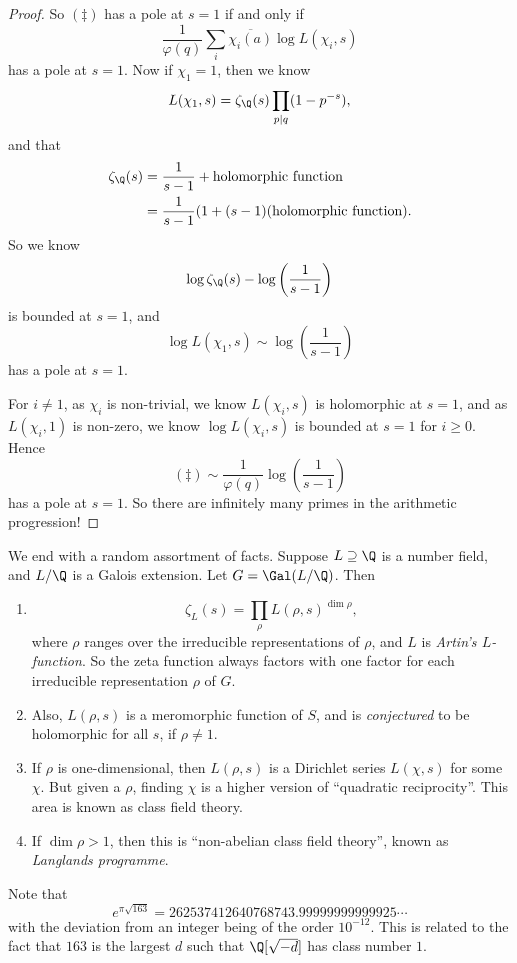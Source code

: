 \documentclass[a4paper]{article}
\begin{document}
\begin{proof}
  So $(\ddagger)$ has a pole at $s = 1$ if and only if
  \[
    \frac{1}{\varphi(q)} \sum_i \overline{\chi_i (a)} \log L(\chi_i, s)
  \]
  has a pole at $s = 1$. Now if $\chi_1 = 1$, then we know
  \[
    L(\chi_1, s) = \zeta_{\Q}(s) \prod_{p \mid q}(1 - p^{-s}),
  \]
  and that
  \begin{align*}
    \zeta_\Q(s) &= \frac{1}{s - 1} + \text{holomorphic function} \\
    &= \frac{1}{s - 1}(1 + (s - 1)(\text{holomorphic function}).
  \end{align*}
  So we know
  \[
    \log \zeta_\Q(s) - \log\left(\frac{1}{s - 1}\right)
  \]
  is bounded at $s = 1$, and
  \[
    \log L(\chi_1, s) \sim \log\left(\frac{1}{s - 1}\right)
  \]
  has a pole at $s = 1$.

  For $i \not= 1$, as $\chi_i$ is non-trivial, we know $L(\chi_i, s)$ is holomorphic at $s = 1$, and as $L(\chi_i, 1)$ is non-zero, we know $\log L(\chi_i, s)$ is bounded at $s = 1$ for $i \geq 0$. Hence
  \[
    (\ddagger) \sim \frac{1}{\varphi(q)} \log\left(\frac{1}{s - 1}\right)
  \]
  has a pole at $s = 1$. So there are infinitely many primes in the arithmetic progression!
\end{proof}

We end with a random assortment of facts. Suppose $L \supseteq \Q$ is a number field, and $L/\Q$ is a Galois extension. Let $G = \Gal(L/\Q)$. Then

\begin{enumerate}
  \item
    \[
      \zeta_L(s) = \prod_{\rho} L(\rho, s)^{\dim \rho},
    \]
    where $\rho$ ranges over the irreducible representations of $\rho$, and $L$ is \emph{Artin's $L$-function}.
    So the zeta function always factors with one factor for each irreducible representation $\rho$ of $G$.
  \item Also, $L(\rho, s)$ is a meromorphic function of $S$, and is \emph{conjectured} to be holomorphic for all $s$, if $\rho \not= 1$.
  \item If $\rho$ is one-dimensional, then $L(\rho, s)$ is a Dirichlet series $L(\chi, s)$ for some $\chi$. But given a $\rho$, finding $\chi$ is a higher version of ``quadratic reciprocity''. This area is known as class field theory.
  \item If $\dim \rho > 1$, then this is ``non-abelian class field theory'', known as \emph{Langlands programme}.
\end{enumerate}

Note that
\[
  e^{\pi\sqrt{163}} = 262537412640768743.99999999999925\cdots
\]
with the deviation from an integer being of the order $10^{-12}$. This is related to the fact that $163$ is the largest $d$ such that $\Q[\sqrt{-d}]$ has class number $1$.
\printindex
\end{document}

